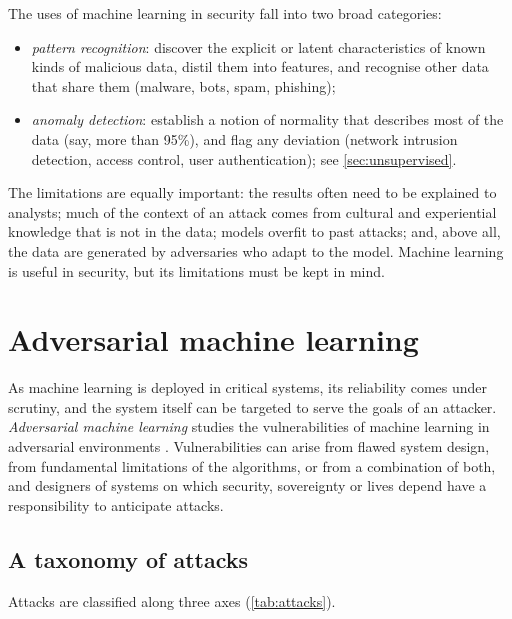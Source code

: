 The uses of machine learning in security fall into two broad categories:
\begin{itemize}
  \item \emph{pattern recognition}: discover the explicit or latent characteristics of known kinds of
        malicious data, distil them into features, and recognise other data that share them (malware,
        bots, spam, phishing);
  \item \emph{anomaly detection}: establish a notion of normality that describes most of the data (say,
        more than 95\%), and flag any deviation (network intrusion detection, access control, user
        authentication); see \cref{sec:unsupervised}.
\end{itemize}
The limitations are equally important: the results often need to be explained to analysts; much of the
context of an attack comes from cultural and experiential knowledge that is not in the data; models
overfit to past attacks; and, above all, the data are generated by adversaries who adapt to the model.
Machine learning is useful in security, but its limitations must be kept in mind.

\section{Adversarial machine learning}\label{sec:adversarial}

As machine learning is deployed in critical systems, its reliability comes under scrutiny, and the
system itself can be targeted to serve the goals of an attacker. \emph{Adversarial machine learning}
studies the vulnerabilities of machine learning in adversarial environments
\citep{huang2011adversarial,biggio2018wild}. Vulnerabilities can arise from flawed system design, from
fundamental limitations of the algorithms, or from a combination of both, and designers of systems on
which security, sovereignty or lives depend have a responsibility to anticipate attacks.

\subsection{A taxonomy of attacks}

Attacks are classified along three axes \citep{barreno2006can,huang2011adversarial}
(\cref{tab:attacks}).

